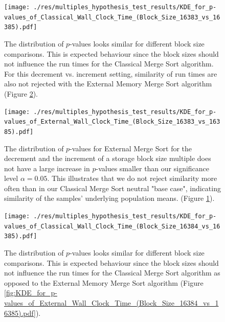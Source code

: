 \documentclass[twocolumn]{article}
\begin{document}
\begin{figure}[htb]
    \begin{minipage}{0.475 \textwidth}
        \centering
        \texttt{[image: ./res/multiples\_hypothesis\_test\_results/KDE\_for\_p-values\_of\_Classical\_Wall\_Clock\_Time\_(Block\_Size\_16383\_vs\_16385).pdf]}
        \caption{The distribution of \( p \)-values looks similar for different block size comparisons. This is expected behaviour since the block sizes should not influence the run times for the Classical Merge
            Sort algorithm. For this decrement vs. increment setting, similarity of run times are also not rejected with the External Memory Merge Sort algorithm
            (Figure \ref{fig:KDE_for_p-values_of_External_Wall_Clock_Time_(Block_Size_16383_vs_16385).pdf}).}
        \label{fig:KDE_for_p-values_of_Classical_Wall_Clock_Time_(Block_Size_16383_vs_16385).pdf}
    \end{minipage}
\end{figure}

\begin{figure}[htb]
    \begin{minipage}{0.475 \textwidth}
        \centering
        \texttt{[image: ./res/multiples\_hypothesis\_test\_results/KDE\_for\_p-values\_of\_External\_Wall\_Clock\_Time\_(Block\_Size\_16383\_vs\_16385).pdf]}
        \caption{The distribution of \( p \)-values for External Merge Sort for the decrement and the increment of a storage block size multiple does not have a large increase in \( p \)-values
            smaller than our significance level \( \alpha = 0.05 \). This illustrates that we do not reject similarity more often than in our Classical Merge Sort neutral "base case", indicating similarity of the samples' underlying population means.
            (Figure \ref{fig:KDE_for_p-values_of_Classical_Wall_Clock_Time_(Block_Size_16383_vs_16385).pdf}).}
        \label{fig:KDE_for_p-values_of_External_Wall_Clock_Time_(Block_Size_16383_vs_16385).pdf}
    \end{minipage}
\end{figure}

\begin{figure}[htb]
    \begin{minipage}{0.475 \textwidth}
        \centering
        \texttt{[image: ./res/multiples\_hypothesis\_test\_results/KDE\_for\_p-values\_of\_Classical\_Wall\_Clock\_Time\_(Block\_Size\_16384\_vs\_16385).pdf]}
        \caption{The distribution of \( p \)-values looks similar for different block size comparisons. This is expected behaviour since the block sizes should not influence the run times for the Classical Merge
            Sort algorithm as opposed to the External Memory Merge Sort algorithm (Figure \ref{fig:KDE_for_p-values_of_External_Wall_Clock_Time_(Block_Size_16384_vs_16385).pdf}).}
        \label{fig:KDE_for_p-values_of_Classical_Wall_Clock_Time_(Block_Size_16384_vs_16385).pdf}
    \end{minipage}
\end{figure}
\end{document}
